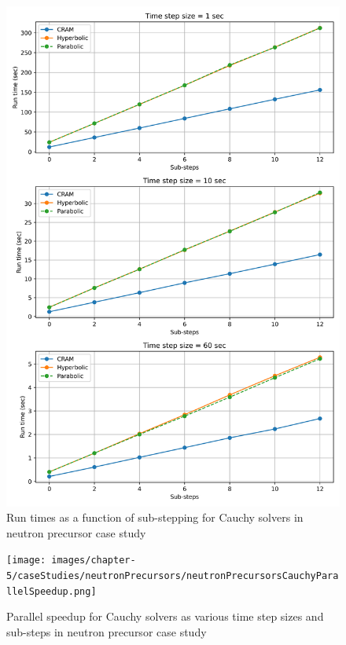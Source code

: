 \begin{figure}[p]
    \centering
    \includegraphics[width=5in]{images/chapter-5/caseStudies/neutronPrecursors/neutronPrecursorsCauchyRuntimes.png}
    \caption{Run times as a function of sub-stepping for Cauchy solvers in neutron precursor case study}
    \label{fig:neutron_precursors_substepping_cauchy_runtimes}
\end{figure}

\clearpage

\begin{figure}
    \centering
    \texttt{[image: images/chapter-5/caseStudies/neutronPrecursors/neutronPrecursorsCauchyParallelSpeedup.png]}
    \caption{Parallel speedup for Cauchy solvers as various time step sizes and sub-steps in neutron precursor case study}
    \label{fig:neutron_precursors_cauchy_speedup}
\end{figure}

